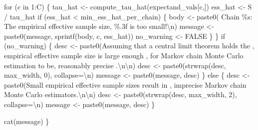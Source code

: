 \documentclass[
  letterpaper,
  DIV=11,
  numbers=noendperiod]{scrartcl}
\newenvironment{Shaded}{\begin{snugshade}}{\end{snugshade}}
\newcommand{\CharTok}[1]{\textcolor[rgb]{0.13,0.47,0.30}{#1}}
\newcommand{\ControlFlowTok}[1]{\textcolor[rgb]{0.00,0.23,0.31}{#1}}
\newcommand{\DecValTok}[1]{\textcolor[rgb]{0.68,0.00,0.00}{#1}}
\newcommand{\KeywordTok}[1]{\textcolor[rgb]{0.00,0.23,0.31}{#1}}
\newcommand{\NormalTok}[1]{\textcolor[rgb]{0.00,0.23,0.31}{#1}}
\newcommand{\OperatorTok}[1]{\textcolor[rgb]{0.37,0.37,0.37}{#1}}
\newcommand{\SpecialCharTok}[1]{\textcolor[rgb]{0.37,0.37,0.37}{#1}}
\newcommand{\StringTok}[1]{\textcolor[rgb]{0.13,0.47,0.30}{#1}}
\begin{document}
\begin{Shaded}
\begin{Highlighting}[]
  \ControlFlowTok{for}\NormalTok{ (c }\KeywordTok{in} \DecValTok{1}\NormalTok{:C) \{}
\NormalTok{    tau\_hat }\OperatorTok{\textless{}{-}}\NormalTok{ compute\_tau\_hat(expectand\_vals[c,])}
\NormalTok{    ess\_hat }\OperatorTok{\textless{}{-}}\NormalTok{ S }\OperatorTok{/}\NormalTok{ tau\_hat}
    \ControlFlowTok{if}\NormalTok{ (ess\_hat }\OperatorTok{\textless{}}\NormalTok{ min\_ess\_hat\_per\_chain) \{}
\NormalTok{      body }\OperatorTok{\textless{}{-}}\NormalTok{ paste0(}\StringTok{\textquotesingle{}  Chain }\SpecialCharTok{\%s}\StringTok{: The empirical effective sample size\textquotesingle{}}\NormalTok{,}
                     \StringTok{\textquotesingle{}}\SpecialCharTok{\%.3f}\StringTok{ is too small!}\CharTok{\textbackslash{}n}\StringTok{\textquotesingle{}}\NormalTok{)}
\NormalTok{      message }\OperatorTok{\textless{}{-}}\NormalTok{ paste0(message, sprintf(body, c, ess\_hat))}
\NormalTok{      no\_warning }\OperatorTok{\textless{}{-}}\NormalTok{ FALSE}
\NormalTok{    \}}
\NormalTok{  \}}
  \ControlFlowTok{if}\NormalTok{ (no\_warning) \{}
\NormalTok{    desc }\OperatorTok{\textless{}{-}}\NormalTok{ paste0(}\StringTok{\textquotesingle{}Assuming that a central limit theorem holds the \textquotesingle{}}\NormalTok{,}
                   \StringTok{\textquotesingle{}empirical effective sample size is large enough \textquotesingle{}}\NormalTok{,}
                   \StringTok{\textquotesingle{}for Markov chain Monte Carlo estimation to be\textquotesingle{}}\NormalTok{,}
                   \StringTok{\textquotesingle{}reasonably precise .}\CharTok{\textbackslash{}n\textbackslash{}n}\StringTok{\textquotesingle{}}\NormalTok{)}
\NormalTok{    desc }\OperatorTok{\textless{}{-}}\NormalTok{ paste0(strwrap(desc, max\_width, }\DecValTok{0}\NormalTok{), collapse}\OperatorTok{=}\StringTok{\textquotesingle{}}\CharTok{\textbackslash{}n}\StringTok{\textquotesingle{}}\NormalTok{)}
\NormalTok{    message }\OperatorTok{\textless{}{-}}\NormalTok{ paste0(message, desc)}
\NormalTok{  \} }\ControlFlowTok{else}\NormalTok{ \{}
\NormalTok{    desc }\OperatorTok{\textless{}{-}}\NormalTok{ paste0(}\StringTok{\textquotesingle{}Small empirical effective sample sizes result in \textquotesingle{}}\NormalTok{,}
                   \StringTok{\textquotesingle{}imprecise Markov chain Monte Carlo estimators.}\CharTok{\textbackslash{}n\textbackslash{}n}\StringTok{\textquotesingle{}}\NormalTok{)}
\NormalTok{    desc }\OperatorTok{\textless{}{-}}\NormalTok{ paste0(strwrap(desc, max\_width, }\DecValTok{2}\NormalTok{), collapse}\OperatorTok{=}\StringTok{\textquotesingle{}}\CharTok{\textbackslash{}n}\StringTok{\textquotesingle{}}\NormalTok{)}
\NormalTok{    message }\OperatorTok{\textless{}{-}}\NormalTok{ paste0(message, desc)}
\NormalTok{  \}}
  
\NormalTok{  cat(message)}
\NormalTok{\}}
\end{Highlighting}
\end{Shaded}
\end{document}
